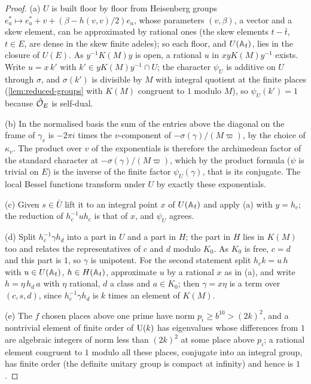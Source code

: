 \begin{proof}
(a) $U$ is built floor by floor from Heisenberg groups $e^*_a\mapsto e^*_a+v+(\beta-h(v,v)/2)e_a$, whose parameters $(v,\beta)$, a vector and a skew element, can be approximated by rational ones (the skew elements $t-\bar t$, $t\in E$, are dense in the
skew finite adeles); so each floor, and $U(\mathbb{A}_{\rm f})$, lies in the closure of $U(E)$. As $y^{-1}K(M)y$ is open, a rational $u$ in $xyK(M)y^{-1}$ exists. Write $u=x\,k'$ with $k'\in yK(M)y^{-1}\cap U$; the character $\psi_U$ is additive on $U$ through $\sigma$, and $\sigma(k')$
is divisible by $M$ with integral quotient at the finite places (\cref{lem:reduced-groups} with $K(M)$ congruent to $1$ modulo $M$), so $\psi_U(k')=1$ because $\hat{\mathcal{O}}_E$ is self-dual.

(b) In the normalised basis the sum of the entries above the diagonal on the frame of $\gamma_v$ is $-2\pi i$ times the $v$-component of $-\sigma(\gamma)/(M\varpi)$, by the choice of $\kappa_v$. The product over $v$ of the
exponentials is therefore the archimedean factor of the standard character at $-\sigma(\gamma)/(M\varpi)$, which by the product formula ($\psi$ is trivial on $E$) is the inverse of the finite factor $\psi_U(\gamma)$, that is its conjugate. The
local Bessel functions transform under $U$ by exactly these exponentials.

(c) Given $s\in\bar U$ lift it to an integral point $x$ of $U(\mathbb{A}_{\rm f})$ and apply (a) with $y=h_c$; the reduction of $h_c^{-1}uh_c$ is that of $x$, and $\psi_U$ agrees.

(d) Split $h_c^{-1}\gamma h_d$ into a part in $U$ and a part in $H$; the part in $H$ lies in $K(M)$ too and relates the representatives of $c$ and $d$ modulo $K_0$. As $K_0$ is free, $c=d$ and this part is $1$, so $\gamma$ is unipotent.
For the second statement split $h_ck=u\,h$ with $u\in U(\mathbb{A}_{\rm f})$, $h\in H(\mathbb{A}_{\rm f})$, approximate $u$ by a rational $x$ as in (a), and write $h=\eta\,h_d\,a$ with $\eta$ rational, $d$ a class and $a\in K_0$; then $\gamma=x\eta$ is a term
over $(c,s,d)$, since $h_c^{-1}\gamma h_d$ is $k$ times an element of $K(M)$.

(e) The $f$ chosen places above one prime have norm $p_i\ge b^{10}>(2k)^2$, and a nontrivial element of finite order of $\operatorname{U}(k)$ has eigenvalues whose differences from $1$ are algebraic integers of norm less than $(2k)^{2}$ at
some place above $p_i$; a rational element congruent to $1$ modulo all these places, conjugate into an integral group, has finite order (the definite unitary group is compact at infinity) and hence is $1$.
\end{proof}

